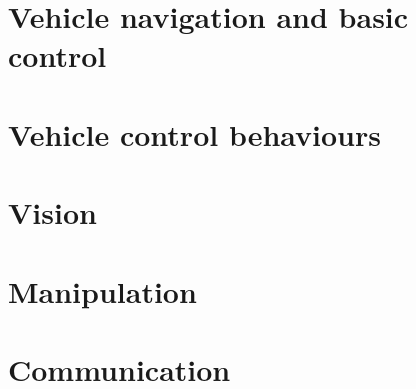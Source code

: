 \documentclass[10pt]{article}
\begin{document}
\maketitle

\tableofcontents

\section{Vehicle navigation and basic control}














\section{Vehicle control behaviours}








\section{Vision}









\section{Manipulation}







\section{Communication}


\end{document}
